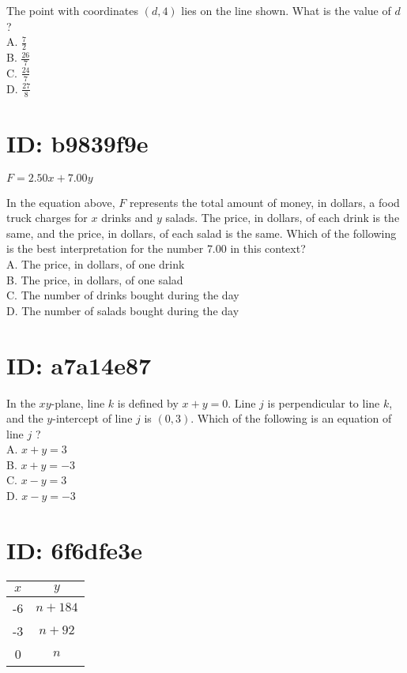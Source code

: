 The point with coordinates $(d, 4)$ lies on the line shown. What is the value of $d$ ?\\
A. $\frac{7}{2}$\\
B. $\frac{26}{7}$\\
C. $\frac{24}{7}$\\
D. $\frac{27}{8}$

\section*{ID: b9839f9e}
$F=2.50 x+7.00 y$

In the equation above, $F$ represents the total amount of money, in dollars, a food truck charges for $x$ drinks and $y$ salads. The price, in dollars, of each drink is the same, and the price, in dollars, of each salad is the same. Which of the following is the best interpretation for the number 7.00 in this context?\\
A. The price, in dollars, of one drink\\
B. The price, in dollars, of one salad\\
C. The number of drinks bought during the day\\
D. The number of salads bought during the day

\section*{ID: a7a14e87}
In the $x y$-plane, line $k$ is defined by $x+y=0$. Line $j$ is perpendicular to line $k$, and the $y$-intercept of line $j$ is $(0,3)$. Which of the following is an equation of line $j$ ?\\
A. $x+y=3$\\
B. $x+y=-3$\\
C. $x-y=3$\\
D. $x-y=-3$

\section*{ID: 6f6dfe3e}
\begin{center}
\begin{tabular}{|c|c|}
\hline
$x$ & $y$ \\
\hline
-6 & $n+184$ \\
\hline
-3 & $n+92$ \\
\hline
0 & $n$ \\
\hline
\end{tabular}
\end{center}

